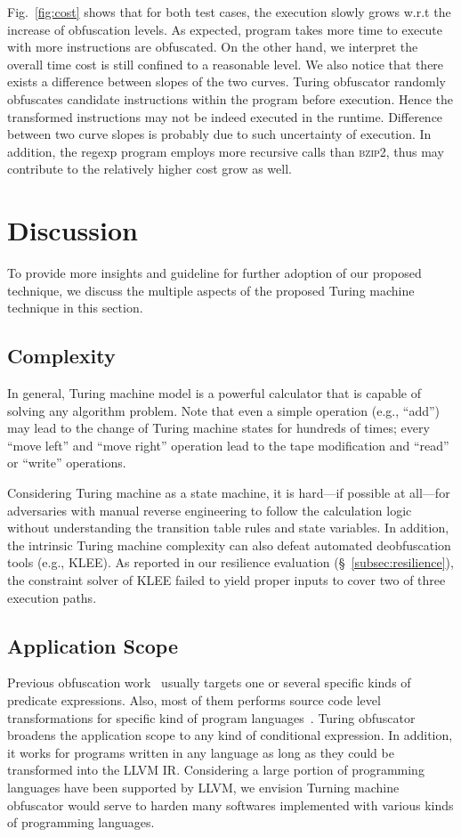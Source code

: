\documentclass[lnicst]{svmultln}
\newcommand{\F}{Fig.}
\begin{document}
\F~\ref{fig:cost} shows that for both test cases, the execution slowly grows
w.r.t the increase of obfuscation levels. As expected, program takes more time
to execute with more instructions are obfuscated. On the other hand, we
interpret the overall time cost is still confined to a reasonable level. We also
notice that there exists a difference between slopes of the two curves. Turing
obfuscator randomly obfuscates candidate instructions within the program before
execution. Hence the transformed instructions may not be indeed executed in the
runtime. Difference between two curve slopes is probably due to such uncertainty
of execution. In addition, the regexp program employs more recursive calls than
\textsc{bzip2}, thus may contribute to the relatively higher cost grow as well.



\section{Discussion}
\label{sec:discussion}
To provide more insights and guideline for further adoption of our proposed
technique, we discuss the multiple aspects of the proposed Turing machine
technique in this section.

\subsection{Complexity}
In general, Turing machine model is a powerful calculator that is capable of
solving any algorithm problem. Note that even a simple operation (e.g., ``add'')
may lead to the change of Turing machine states for hundreds of times; every
``move left'' and ``move right'' operation lead to the tape modification and
``read'' or ``write'' operations.

Considering Turing machine as a state machine, it is hard---if possible at
all---for adversaries with manual reverse engineering to follow the calculation
logic without understanding the transition table rules and state variables. In
addition, the intrinsic Turing machine complexity can also defeat automated
deobfuscation tools (e.g., KLEE). As reported in our resilience evaluation
(\S~\ref{subsec:resilience}), the constraint solver of KLEE failed to yield
proper inputs to cover two of three execution paths.

\subsection{Application Scope}
Previous obfuscation work~\cite{Sharif} usually targets one or several specific
kinds of predicate expressions. Also, most of them performs source code level
transformations for specific kind of program languages~\cite{Trans}. Turing
obfuscator broadens the application scope to any kind of conditional expression.
In addition, it works for programs written in any language as long as they could
be transformed into the LLVM IR. Considering a large portion of programming
languages have been supported by LLVM, we envision Turning machine obfuscator
would serve to harden many softwares implemented with various kinds of
programming languages.
\end{document}
